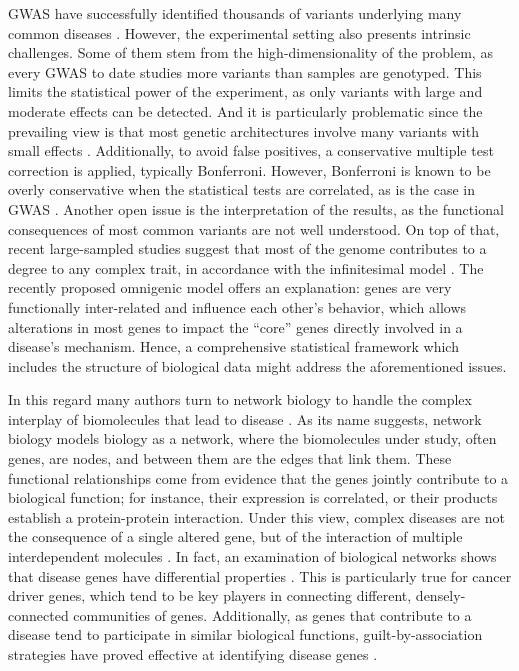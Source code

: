 \documentclass[twocolumn, 10pt]{article}
\begin{document}
GWAS have successfully identified thousands of variants underlying many common diseases \cite{buniello_nhgri-ebi_2019}. However, the experimental setting also presents intrinsic challenges. Some of them stem from the high-dimensionality of the problem, as every GWAS to date studies more variants than samples are genotyped. This limits the statistical power of the experiment, as only variants with large and moderate effects can be detected. And it is particularly problematic since the prevailing view is that most genetic architectures involve many variants with small effects \cite{visscher_10_2017}. Additionally, to avoid false positives, a conservative multiple test correction is applied, typically Bonferroni. However, Bonferroni is known to be overly conservative when the statistical tests are correlated, as is the case in GWAS \cite{wang_statistical_2018}. Another open issue is the interpretation of the results, as the functional consequences of most common variants are not well understood. On top of that, recent large-sampled studies suggest that most of the genome contributes to a degree to any complex trait, in accordance with the infinitesimal model \cite{barton_infinitesimal_2017}. The recently proposed omnigenic model \cite{boyle_expanded_2017} offers an explanation: genes are very functionally inter-related and influence each other's behavior, which allows alterations in most genes to impact the ``core'' genes directly involved in a disease's mechanism. Hence, a comprehensive statistical framework which includes the structure of biological data might address the aforementioned issues.

In this regard many authors turn to network biology to handle the complex interplay of biomolecules that lead to disease \cite{furlong_human_2013}. As its name suggests, network biology models biology as a network, where the biomolecules under study, often genes, are nodes, and between them are the edges that link them. These functional relationships come from evidence that the genes jointly contribute to a biological function; for instance, their expression is correlated, or their products establish a protein-protein interaction. Under this view, complex diseases are not the consequence of a single altered gene, but of the interaction of multiple interdependent molecules \cite{barabasi_network_2011}. In fact, an examination of biological networks shows that disease genes have differential properties \cite{barabasi_network_2011} \cite{pinero_uncovering_2016}. This is particularly true for cancer driver genes, which tend to be key players in connecting different, densely-connected communities of genes. Additionally, as genes that contribute to a disease tend to participate in similar biological functions, guilt-by-association strategies have proved effective at identifying disease genes \cite{huang_systematic_2018}. 
\end{document}
